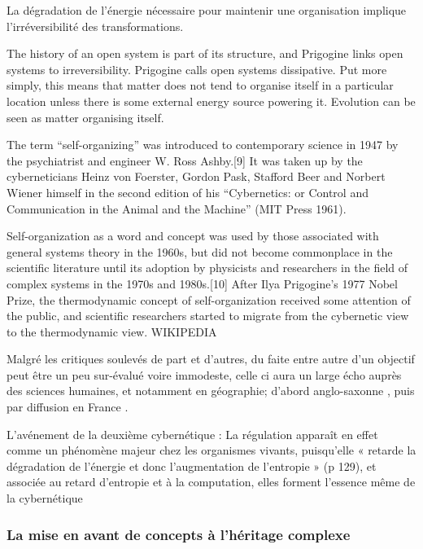 La dégradation de l'énergie nécessaire pour maintenir une organisation implique l'irréversibilité des transformations.


The history of an open system is part of its structure, and Prigogine links open systems to irreversibility. Prigogine calls open systems dissipative. Put more simply, this means that matter does not tend to organise itself in a particular location unless there is some external energy source powering it. Evolution can be seen as matter organising itself.


The term \enquote{self-organizing} was introduced to contemporary science in 1947 by the psychiatrist and engineer W. Ross Ashby.[9] It was taken up by the cyberneticians Heinz von Foerster, Gordon Pask, Stafford Beer and Norbert Wiener himself in the second edition of his \enquote{Cybernetics: or Control and Communication in the Animal and the Machine} (MIT Press 1961).

Self-organization as a word and concept was used by those associated with general systems theory in the 1960s, but did not become commonplace in the scientific literature until its adoption by physicists and researchers in the field of complex systems in the 1970s and 1980s.[10] After Ilya Prigogine's 1977 Nobel Prize, the thermodynamic concept of self-organization received some attention of the public, and scientific researchers started to migrate from the cybernetic view to the thermodynamic view. WIKIPEDIA


Malgré les critiques soulevés de part et d'autres, du faite entre autre d'un objectif peut être un peu sur-évalué voire immodeste, celle ci aura un large écho auprès des sciences humaines, et notamment en géographie; d'abord anglo-saxonne \autocite{Haggett1965, Chorley1962}, puis par diffusion en France \autocite{Raymond}.



L'avénement de la deuxième cybernétique :
La régulation apparaît en effet comme un phénomène majeur chez les organismes vivants, puisqu’elle « retarde la dégradation de l’énergie et donc l’augmentation de l’entropie » (p 129), et associée au retard d’entropie et à la computation, elles forment l’essence même de la cybernétique

\subsubsection{La mise en avant de concepts à l'héritage complexe}
\label{p:heritage_complexe}

